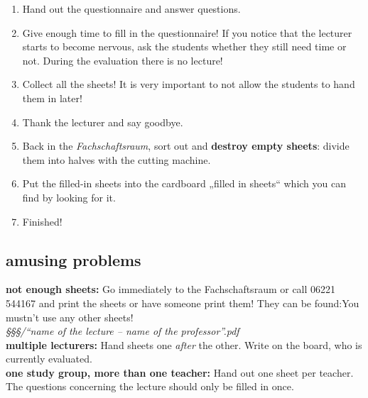 \documentclass[a4paper,10pt]{article}
\begin{document}
\begin{enumerate}
\begin{itemize}
    \end{itemize}
\item Hand out the questionnaire and answer questions.
\item Give enough time to fill in the questionnaire! If you notice that the lecturer starts to become nervous, ask the students whether they still need time or not. During the evaluation there is no lecture!
\item Collect all the sheets! It is very important to not allow the students to hand them in later!
\item Thank the lecturer and say goodbye.
\item Back in the \textit{Fachschaftsraum}, sort out and \textbf{destroy empty sheets}: divide them into halves with the cutting machine.
\item Put the filled-in sheets into the cardboard „filled in sheets“ which you can find by looking for it.
\item Finished!
\end{enumerate}


\subsection*{amusing problems}
\noindent\textbf{not enough sheets:} Go immediately to the Fachschaftsraum or call 06221 544167 and print the sheets or have someone print them! They can be found:\hfill You mustn’t use any other sheets!\\
\textit{§§§/“name of the lecture -- name of the professor”.pdf}\\[0.2cm]
\noindent\textbf{multiple lecturers:} Hand sheets one \emph{after} the other. Write on the board, who is currently evaluated.\\[0.2cm]
\noindent\textbf{one study group, more than one teacher:} Hand out one sheet per teacher. The questions concerning the lecture should only be filled in once.
\end{document}
